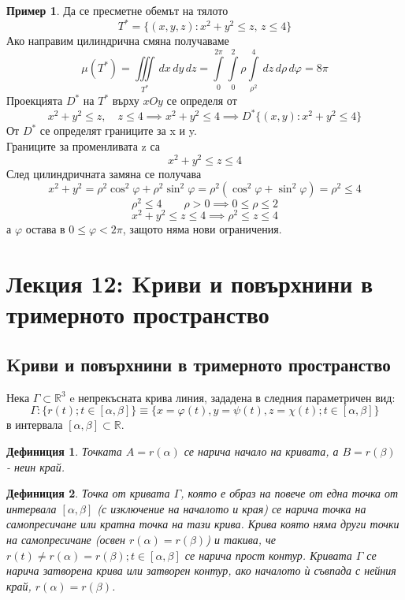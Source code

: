 \documentclass[a4paper,fleqn,12pt]{article}
\newtheorem{definition}{Дефиниция}[subsection]
\theoremstyle{definition}
\newtheorem{example}{Пример}[subsection]
\begin{document}
\begin{example}
Да се пресметне обемът на тялото
$$T^* = \{ (x,y,z) : x^2 + y^2 \leq z, \, z \leq 4\}$$
Ако направим цилиндрична смяна получаваме
$$\mu(T^*) = \iiint\limits_{T^*} \, dx \, dy \, dz = \int\limits_ 0 ^{2\pi} \int\limits_ 0 ^{2} \rho \int\limits_ {\rho^2} ^{4} \, dz \, d\rho \, d\varphi = 8\pi$$
Проекцията $D^* \text{ на } T^*$ върху $xOy$ се определя от 
$$x^2 + y^2 \leq z, \quad z \leq 4 \implies x^2 + y^2 \leq 4 \implies D^* \{ (x,y) : x^2 + y^2 \leq 4 \}$$
От $D^*$ се определят границите за x и y. \\
Границите за променливата z са
$$x^2 + y^2 \leq z \leq 4$$
След цилиндричната замяна се получава
$$x^2 + y^2 = \rho^2 \cos^2 \varphi + \rho^2 \sin^2 \varphi  = \rho^2 ( \cos^2 \varphi +  \sin^2 \varphi) = \rho^2 \leq 4 $$
$$\rho^2 \leq 4 \qquad \rho > 0 \implies 0 \leq \rho \leq 2 $$ 
$$x^2 + y^2 \leq z \leq 4 \implies \rho^2 \leq z \leq 4 $$
а $\varphi$ остава в $0 \leq \varphi < 2 \pi$, защото няма нови ограничения. 
\end{example}

\newpage
\section{Лекция 12: Kриви и повърхнини в тримерното пространство}

\subsection{Kриви и повърхнини в тримерното пространство}
Нека $\Gamma \subset \mathbb{R}^3$ e непрекъсната крива линия, зададена в следния параметричен вид: 
$$\Gamma: \{r(t); t \in [\alpha, \beta] \} \equiv \{x = \varphi(t), y = \psi(t), z = \chi(t) ; t \in [\alpha, \beta] \}$$
в интервала $[\alpha, \beta] \subset \mathbb{R}$.

\begin{definition}
Точката $A = r(\alpha)$ се нарича начало на кривата, а $B = r(\beta)$ - неин край.
\end{definition}

\begin{definition}
Точка от кривата $\Gamma$, която е образ на повече от една точка от интервала $[\alpha, \beta]$ (с изключение на началото и края) се нарича точка на самопресичане или кратна точка на тази крива. 
Крива която няма други точки на самопресичане (освен $r(\alpha) = r(\beta)$) и такива, че $r(t) \neq r(\alpha) = r(\beta); t \in [\alpha, \beta] $ се нарича прост контур. 
Кривата $\Gamma$ се нарича затворена крива или затворен контур, ако началото ѝ съвпада с нейния край, $r(\alpha) = r(\beta)$.
\end{definition}
\end{document}
